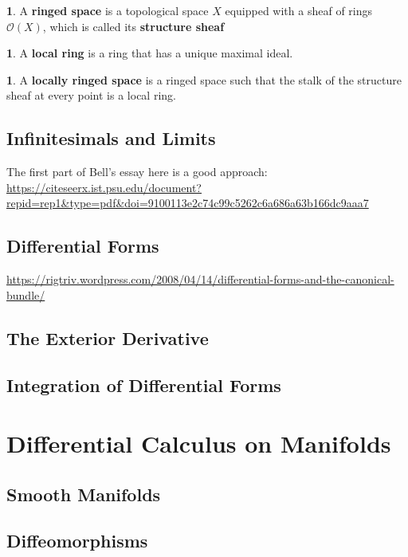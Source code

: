 \documentclass[oneside,english]{amsbook}
\numberwithin{section}{chapter}
\theoremstyle{plain}
\theoremstyle{definition}
\newtheorem{defn}[thm]{\protect\definitionname}
\providecommand{\definitionname}{Definition}
\begin{document}
			\begin{defn} 
				A \textbf{ringed space} is a topological space $X$ equipped with a sheaf of rings $\mathscr{O}(X)$, which is called its \textbf{structure sheaf}
			\end{defn}
			
			\begin{defn} 
				A \textbf{local ring} is a ring that has a unique maximal ideal.
			\end{defn}
			
			\begin{defn} 
				A \textbf{locally ringed space} is a ringed space such that the stalk of the structure sheaf at every point is a local ring.
			\end{defn}

		\section{Infinitesimals and Limits}
		
		The first part of Bell's essay here is a good approach: \url{https://citeseerx.ist.psu.edu/document?repid=rep1&type=pdf&doi=9100113e2c74c99c5262c6a686a63b166dc9aaa7}
		
		\section{Differential Forms}
		
		\url{https://rigtriv.wordpress.com/2008/04/14/differential-forms-and-the-canonical-bundle/}
	
		\section{The Exterior Derivative}
	
		\section{Integration of Differential Forms}

	\chapter{Differential Calculus on Manifolds}
	
		\section{Smooth Manifolds}

		\section{Diffeomorphisms}
\end{document}
